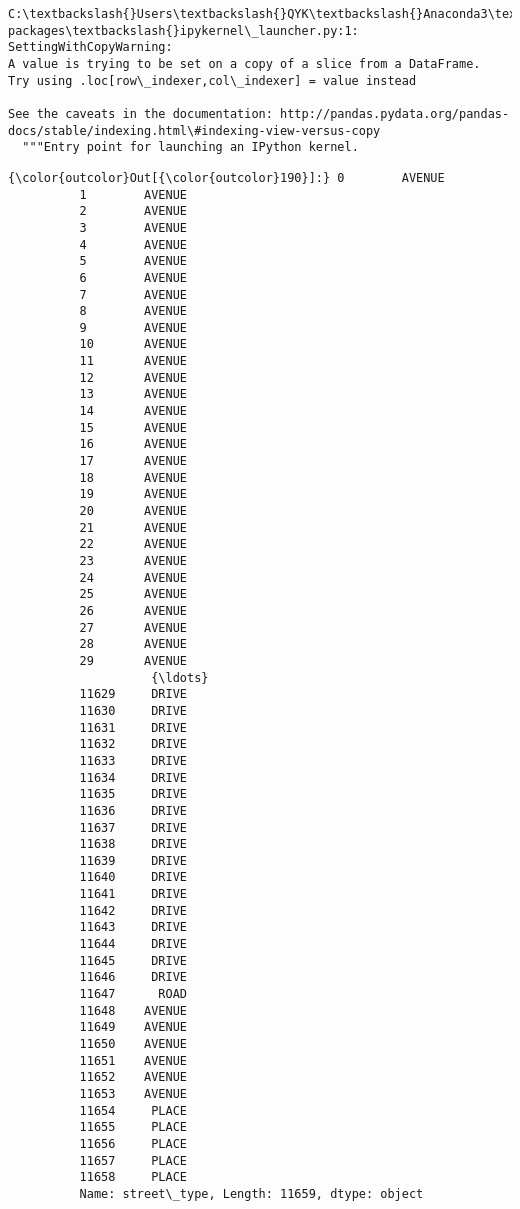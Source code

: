 \documentclass[11pt]{article}
\begin{document}
    \begin{Verbatim}[commandchars=\\\{\}]
C:\textbackslash{}Users\textbackslash{}QYK\textbackslash{}Anaconda3\textbackslash{}lib\textbackslash{}site-packages\textbackslash{}ipykernel\_launcher.py:1: SettingWithCopyWarning: 
A value is trying to be set on a copy of a slice from a DataFrame.
Try using .loc[row\_indexer,col\_indexer] = value instead

See the caveats in the documentation: http://pandas.pydata.org/pandas-docs/stable/indexing.html\#indexing-view-versus-copy
  """Entry point for launching an IPython kernel.

    \end{Verbatim}

\begin{Verbatim}[commandchars=\\\{\}]
{\color{outcolor}Out[{\color{outcolor}190}]:} 0        AVENUE
          1        AVENUE
          2        AVENUE
          3        AVENUE
          4        AVENUE
          5        AVENUE
          6        AVENUE
          7        AVENUE
          8        AVENUE
          9        AVENUE
          10       AVENUE
          11       AVENUE
          12       AVENUE
          13       AVENUE
          14       AVENUE
          15       AVENUE
          16       AVENUE
          17       AVENUE
          18       AVENUE
          19       AVENUE
          20       AVENUE
          21       AVENUE
          22       AVENUE
          23       AVENUE
          24       AVENUE
          25       AVENUE
          26       AVENUE
          27       AVENUE
          28       AVENUE
          29       AVENUE
                    {\ldots}  
          11629     DRIVE
          11630     DRIVE
          11631     DRIVE
          11632     DRIVE
          11633     DRIVE
          11634     DRIVE
          11635     DRIVE
          11636     DRIVE
          11637     DRIVE
          11638     DRIVE
          11639     DRIVE
          11640     DRIVE
          11641     DRIVE
          11642     DRIVE
          11643     DRIVE
          11644     DRIVE
          11645     DRIVE
          11646     DRIVE
          11647      ROAD
          11648    AVENUE
          11649    AVENUE
          11650    AVENUE
          11651    AVENUE
          11652    AVENUE
          11653    AVENUE
          11654     PLACE
          11655     PLACE
          11656     PLACE
          11657     PLACE
          11658     PLACE
          Name: street\_type, Length: 11659, dtype: object
\end{Verbatim}
            
\end{document}
